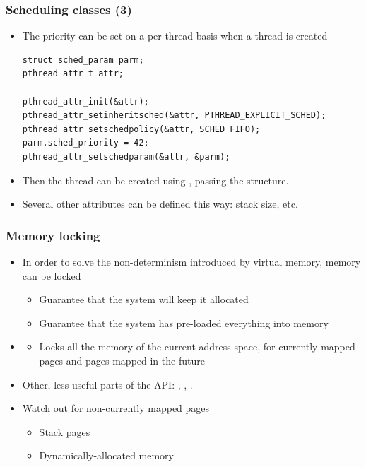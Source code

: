 \begin{frame}[fragile]
  \frametitle{Scheduling classes (3)}
  \begin{itemize}
  \item The priority can be set on a per-thread basis when a thread is
    created
    \begin{block}{}
\footnotesize
\begin{verbatim}
struct sched_param parm;
pthread_attr_t attr;

pthread_attr_init(&attr);
pthread_attr_setinheritsched(&attr, PTHREAD_EXPLICIT_SCHED);
pthread_attr_setschedpolicy(&attr, SCHED_FIFO);
parm.sched_priority = 42;
pthread_attr_setschedparam(&attr, &parm);
\end{verbatim}
\normalsize
    \end{block}
  \item Then the thread can be created using ,
    passing the  structure.
  \item Several other attributes can be defined this way: stack size,
    etc.
  \end{itemize}
\end{frame}

\begin{frame}
  \frametitle{Memory locking}
  \begin{itemize}
  \item In order to solve the non-determinism introduced by virtual
    memory, memory can be locked
    \begin{itemize}
    \item Guarantee that the system will keep it allocated
    \item Guarantee that the system has pre-loaded everything into
      memory
    \end{itemize}
  \item {}
    \begin{itemize}
    \item Locks all the memory of the current address space, for
      currently mapped pages and pages mapped in the future
    \end{itemize}
  \item Other, less useful parts of the API: , ,
    .
  \item Watch out for non-currently mapped pages
    \begin{itemize}
    \item Stack pages
    \item Dynamically-allocated memory
    \end{itemize}
  \end{itemize}
\end{frame}

